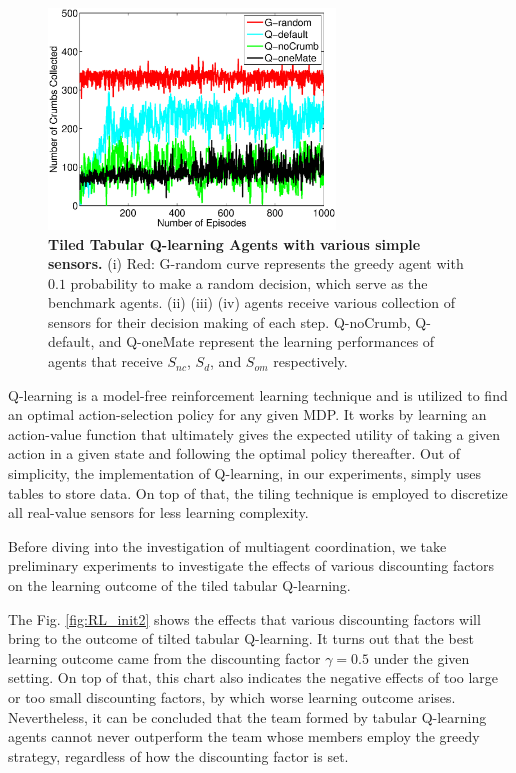 \documentclass[conference]{IEEEtran}
\begin{document}
\begin{figure}[t]
\centering
\includegraphics[width=3.0in]{./figures/RL/init_setup1.eps}
\caption{\textbf{Tiled Tabular Q-learning Agents with various simple sensors.} (i) Red: G-random curve
    represents the greedy agent with $0.1$ probability to make a random
    decision, which serve as the benchmark agents. 
    (ii) (iii) (iv) agents receive various collection of sensors for their
    decision making of each step. Q-noCrumb, Q-default, and Q-oneMate
    represent the learning performances of agents that receive $S_{nc}$,
    $S_{d}$, and $S_{om}$ respectively.
} 
\label{fig:RL_init}
\end{figure}

Q-learning is a model-free reinforcement learning technique and is utilized to
find an optimal action-selection policy for any given MDP. 
It works by learning an action-value function that ultimately gives the
expected utility of taking a given action in a given state and following the
optimal policy thereafter. 
Out of simplicity, the implementation of Q-learning, in our experiments,
simply uses tables to store data. On top of that, the tiling technique is
employed to discretize all real-value sensors for less learning complexity. 

Before diving into the investigation of multiagent coordination, we take 
preliminary experiments to investigate the effects of various discounting
factors on the learning outcome of the tiled tabular Q-learning.


The Fig. \ref{fig:RL_init2} shows the effects that various discounting factors
will bring to the outcome of tilted tabular Q-learning. It turns out that the
best learning outcome came from the discounting factor $\gamma = 0.5$ under
the given setting. On top of that, this chart also indicates the negative
effects of too large or too small discounting factors, by which worse learning
outcome arises. Nevertheless, it can be concluded that the team formed by
tabular Q-learning agents cannot never outperform the team whose members
employ the greedy strategy, regardless of how the discounting factor is set.
\end{document}
